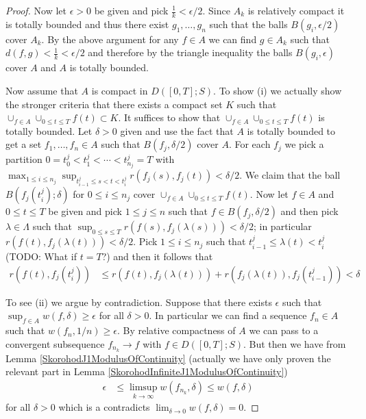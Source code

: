 \begin{proof}
Now let $\epsilon > 0$ be given and pick $\frac{1}{k} < \epsilon /2$.  Since $A_k$ is relatively compact it
is totally bounded and thus there exist $g_1, \dotsc, g_n$ such that the balls $B(g_i, \epsilon/2)$ cover
$A_k$.  By the above argument for any $f \in A$ we can find $g \in A_k$ such that $d(f,g) < \frac{1}{k} < \epsilon/2$ 
and therefore by the triangle inequality the balls $B(g_i, \epsilon)$ cover $A$ and $A$ is totally bounded.
 
Now assume that $A$ is compact in $D([0,T];S)$.  To show (i) we actually show the stronger criteria that there exists a compact set $K$ such that $\cup_{f \in A} \cup_{0 \leq t \leq T} f(t) \subset K$.  It suffices to show that $\cup_{f \in A} \cup_{0 \leq t \leq T} f(t)$ is totally bounded.  Let $\delta > 0$ given and use the fact that $A$ is totally bounded to get a set $f_1, \dotsc, f_n \in A$ such that $B(f_j, \delta/2)$ cover $A$.  For each $f_j$ we pick a partition $0=t^j_0 < t^j_1 < \dotsb < t^j_{n_j} = T$ with $\max_{1 \leq i \leq n_j} \sup_{t^j_{i-1} \leq s < t < t^j_i} r(f_j(s), f_j(t)) < \delta/2$.  We claim that the ball $B(f_j(t^j_i); \delta)$ for $0 \leq i \leq n_j$ cover $\cup_{f \in A} \cup_{0 \leq t \leq T} f(t)$.  Now let $f \in A$ and $0 \leq t \leq T$ be given and pick $1 \leq j \leq n$ such that $f \in B(f_j, \delta/2)$ and then pick $\lambda \in \Lambda$ such that $\sup_{0 \leq s \leq T} r(f(s), f_j(\lambda(s))) < \delta/2$; in particular $r(f(t), f_j(\lambda(t))) < \delta/2$.  Pick $1 \leq i \leq n_j$ such that $t^j_{i-1} \leq \lambda(t) < t^j_i$ (TODO: What if $t = T$?)  and then it follows that 
\begin{align*}
r(f(t), f_j(t^j_i)) &\leq r(f(t), f_j(\lambda(t))) + r( f_j(\lambda(t)), f_j(t^j_{i-1})) < \delta
\end{align*}

To see (ii) we argue by contradiction.  Suppose that there exists $\epsilon$ such that $\sup_{f \in A} w(f, \delta) \geq \epsilon$ for all $\delta > 0$.  In particular we can find a sequence $f_n \in A$ such that $w(f_n, 1/n) \geq \epsilon$.  By relative compactness of $A$ we can pass to a convergent subsequence $f_{n_k} \to f$ with $f \in D([0,T];S)$.  But then
we have from Lemma \ref{SkorohodJ1ModulusOfContinuity} (actually we have only proven the relevant part  in Lemma \ref{SkorohodInfiniteJ1ModulusOfContinuity})
\begin{align*}
\epsilon &\leq \limsup_{k \to \infty} w(f_{n_k}, \delta) \leq w(f, \delta)
\end{align*}
for all $\delta > 0$ which is a contradicts $\lim_{\delta \to 0}  w(f, \delta) = 0$.
 

\end{proof}
